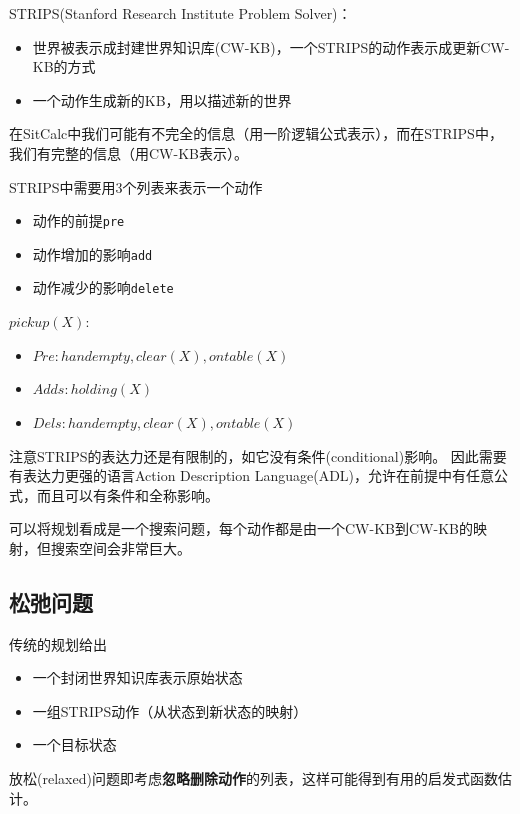 STRIPS(Stanford Research Institute Problem Solver)：
\begin{itemize}
	\item 世界被表示成封建世界知识库(CW-KB)，一个STRIPS的动作表示成更新CW-KB的方式
	\item 一个动作生成新的KB，用以描述新的世界
\end{itemize}

在SitCalc中我们可能有不完全的信息（用一阶逻辑公式表示），而在STRIPS中，我们有完整的信息（用CW-KB表示）。

STRIPS中需要用3个列表来表示一个动作
\begin{itemize}
	\item 动作的前提\verb'pre'
	\item 动作增加的影响\verb'add'
	\item 动作减少的影响\verb'delete'
\end{itemize}
\begin{example}
$pickup(X)$:
\begin{itemize}
\item $Pre: {handempty, clear(X), ontable(X)}$
\item $Adds: {holding(X)}$
\item $Dels: {handempty, clear(X), ontable(X)}$
\end{itemize}
\end{example}

\myhline
注意STRIPS的表达力还是有限制的，如它没有条件(conditional)影响。
因此需要有表达力更强的语言Action Description Language(ADL)，允许在前提中有任意公式，而且可以有条件和全称影响。

可以将规划看成是一个搜索问题，每个动作都是由一个CW-KB到CW-KB的映射，但搜索空间会非常巨大。

\subsection{松弛问题}
传统的规划给出
\begin{itemize}
	\item 一个封闭世界知识库表示原始状态
	\item 一组STRIPS动作（从状态到新状态的映射）
	\item 一个目标状态
\end{itemize}

放松(relaxed)问题即考虑\textbf{忽略删除动作}的列表，这样可能得到有用的启发式函数估计。

